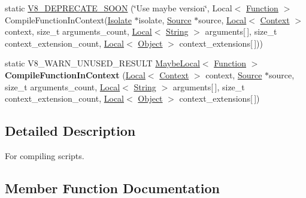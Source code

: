 \begin{DoxyCompactItemize}
\item 
static \hyperlink{classv8_1_1ScriptCompiler_ac2a02a50577714e996a23b8d3396af4d}{V8\+\_\+\+D\+E\+P\+R\+E\+C\+A\+T\+E\+\_\+\+S\+O\+O\+N} (\char`\"{}Use maybe version\char`\"{}, Local$<$ \hyperlink{classv8_1_1Function}{Function} $>$ Compile\+Function\+In\+Context(\hyperlink{classv8_1_1Isolate}{Isolate} $\ast$isolate, \hyperlink{classv8_1_1ScriptCompiler_1_1Source}{Source} $\ast$source, \hyperlink{classv8_1_1Local}{Local}$<$ \hyperlink{classv8_1_1Context}{Context} $>$ context, size\+\_\+t arguments\+\_\+count, \hyperlink{classv8_1_1Local}{Local}$<$ \hyperlink{classv8_1_1String}{String} $>$ arguments\mbox{[}$\,$\mbox{]}, size\+\_\+t context\+\_\+extension\+\_\+count, \hyperlink{classv8_1_1Local}{Local}$<$ \hyperlink{classv8_1_1Object}{Object} $>$ context\+\_\+extensions\mbox{[}$\,$\mbox{]}))
\item 
\hypertarget{classv8_1_1ScriptCompiler_aa11d1768d4c9d5afda451a63360223a5}{}static V8\+\_\+\+W\+A\+R\+N\+\_\+\+U\+N\+U\+S\+E\+D\+\_\+\+R\+E\+S\+U\+L\+T \hyperlink{classv8_1_1MaybeLocal}{Maybe\+Local}$<$ \hyperlink{classv8_1_1Function}{Function} $>$ {\bfseries Compile\+Function\+In\+Context} (\hyperlink{classv8_1_1Local}{Local}$<$ \hyperlink{classv8_1_1Context}{Context} $>$ context, \hyperlink{classv8_1_1ScriptCompiler_1_1Source}{Source} $\ast$source, size\+\_\+t arguments\+\_\+count, \hyperlink{classv8_1_1Local}{Local}$<$ \hyperlink{classv8_1_1String}{String} $>$ arguments\mbox{[}$\,$\mbox{]}, size\+\_\+t context\+\_\+extension\+\_\+count, \hyperlink{classv8_1_1Local}{Local}$<$ \hyperlink{classv8_1_1Object}{Object} $>$ context\+\_\+extensions\mbox{[}$\,$\mbox{]})\label{classv8_1_1ScriptCompiler_aa11d1768d4c9d5afda451a63360223a5}

\end{DoxyCompactItemize}


\subsection{Detailed Description}
For compiling scripts. 

\subsection{Member Function Documentation}
\hypertarget{classv8_1_1ScriptCompiler_aea78877b0dccde1e587ee1ddeda1c155}{}
